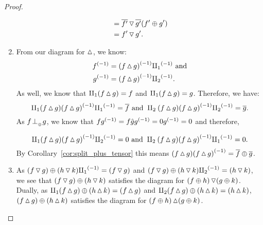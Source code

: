 \begin{proof}
\begin{enumerate}[{(}i{)}]
\begin{align*}
          & = \rst{f'} \tjdown \rst{g'}  (f'\+g') \\
          & = f'\tjdown g'.
      \end{align*}
    \item From our diagram for $\tjup$, we know:
      \begin{align*}
        \inv{f} &= \inv{(f\tjup g)} \icpa\text{ and}\\
        \inv{g} &= \inv{(f\tjup g)} \icpb.
      \end{align*}
      As well, we know that $\cpa(f\tjup g) = f$ and
      $\cpa(f\tjup g) = g$.
      Therefore, we have:
      \[
         \cpa(f\tjup g)\inv{(f\tjup g)} \icpa = \rst{f} \text{ and  }
          \cpb(f\tjup g)\inv{(f\tjup g)} \icpb = \rst{g}.
      \]
      As $f\tperp g$, we know that $f\inv{g} = f \rg{g} \inv{g} = 0 \inv{g} = 0$ and therefore,

      \[
         \cpa(f\tjup g)\inv{(f\tjup g)} \icpb = 0 \text{ and  }
          \cpb(f\tjup g)\inv{(f\tjup g)} \icpa = 0.
      \]
      By Corollary~\ref{cor:split_plus_tensor} this means
      $(f\tjup g)\inv{(f\tjup g)} = \rst{f} \+ \rst{g}$.
    \item As $(f\tjdown g)\+ (h\tjdown k)\icpa = (f\tjdown g)$ and
      $(f\tjdown g)\+ (h\tjdown k) \icpb = (h\tjdown k)$, we see that
      $(f\tjdown g)\+ (h\tjdown k)$ satisfies the diagram for $(f\+h)\tjdown(g\+k)$. Dually, as
      $\cpa (f\tjup g)\+ (h\tjup k) = (f\tjup g)$ and
      $\cpb(f\tjup g)\+ (h\tjup k) = (h\tjup k)$, $(f\tjup g)\+ (h\tjup k)$ satisfies
      the diagram for $(f\+h)\tjup(g\+k)$.
  \end{enumerate}
\end{proof}


